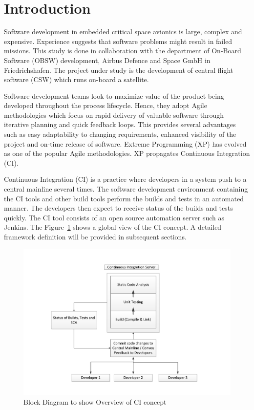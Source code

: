 \documentclass[12pt, a4paper, titlepage]{scrartcl}
\begin{document}
\pagebreak
\tableofcontents 
\pagebreak
\listoffigures
\newpage

\section{Introduction}
\par Software development in embedded critical space avionics is large, complex and expensive. Experience suggests that software problems might result in failed missions. This study is done in collaboration with the department of On-Board Software (OBSW) development, Airbus Defence and Space GmbH in Friedrichshafen. The project under study is the development of central flight software (CSW) which runs on-board a satellite.
\par Software development teams look to maximize value of the product being developed throughout the process lifecycle. Hence, they adopt Agile methodologies\cite{cohen2003agile} which focus on rapid delivery of valuable software through iterative planning and quick feedback loops. This provides several advantages such as easy adaptability to changing requirements, enhanced visibility of the project and on-time release of software. Extreme Programming (XP)\cite{beck2000extreme} has evolved as one of the popular Agile methodologies. XP propagates Continuous Integration (CI). 
\par Continuous Integration (CI) is a practice where developers in a system push to a central mainline several times. The software development environment containing the CI tools and other build tools perform the builds and tests in an automated manner. The developers then expect to receive status of the builds and tests quickly. The CI tool consists of an open source automation server such as Jenkins\cite{jenkinsDoc}. The Figure~\ref{fig:ci-overview-block} shows a global view of the CI concept. A detailed framework definition will be provided in subsequent sections. 
\begin{figure}[!ht]
\centering
\hspace*{-1cm}
	\includegraphics[scale=0.59,clip, trim=0cm 1cm 0cm 1cm]{CI-workflow.pdf}
\caption{Block Diagram to show Overview of CI concept}
\label{fig:ci-overview-block}
\end{figure}
\end{document}
